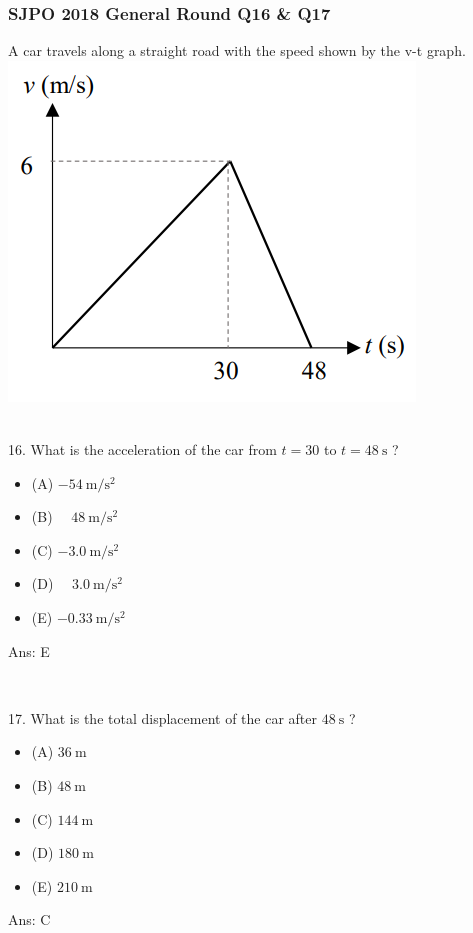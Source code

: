 \documentclass{article}
\begin{document}
\subsubsection{SJPO 2018 General Round Q16 \& Q17}
A car travels along a straight road with the speed shown by the 
v-t graph. \\ \includegraphics[width=0.5\linewidth]{images/2018q16.png} \\
\\
\begin{samepage}
16. What is the acceleration of the car from $t=30$ to $t=48 \mathrm{~s}$ ?
\begin{itemize}
\item[] (A) $-54 \mathrm{~m} / \mathrm{s}^2$ 
\item[] (B) $\quad 48 \mathrm{~m} / \mathrm{s}^2$ 
\item[] (C) $-3.0 \mathrm{~m} / \mathrm{s}^2$ 
\item[] (D) $\quad 3.0 \mathrm{~m} / \mathrm{s}^2$
\item[] (E) $-0.33 \mathrm{~m} / \mathrm{s}^2$\end{itemize}
Ans: \ifpaper E \fi
\end{samepage}
\\[20pt]
\begin{samepage}
17. What is the total displacement of the car after $48 \mathrm{~s}$ ?
\begin{itemize}
\item[] (A) $36 \mathrm{~m}$
\item[] (B) $48 \mathrm{~m}$
\item[] (C) $144 \mathrm{~m}$
\item[] (D) $180 \mathrm{~m}$
\item[] (E) $210 \mathrm{~m}$ 
\end{itemize}
Ans: \ifpaper C \fi\\
\end{samepage}
\\
\end{document}
